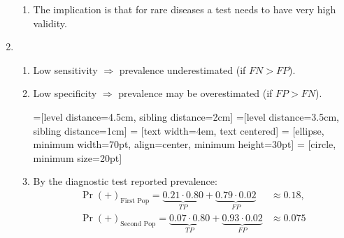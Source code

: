 \documentclass[12pt,a4paper,twoside]{article}
\begin{document}
\begin{enumerate}[label=\bfseries Q\arabic*.]
\begin{enumerate}
  \item %
    The implication is that for rare diseases a test needs to have very high validity.
  \end{enumerate}
  
\item %

  \begin{enumerate}
    
  \item %
    Low sensitivity $\Rightarrow$ prevalence underestimated (if $FN > FP$).
    
  \item
    Low specificity $\Rightarrow$ prevalence may be overestimated
    (if $FP > FN$).	
    
    
    
    =[level distance=4.5cm, sibling distance=2cm]
    =[level distance=3.5cm, sibling distance=1cm]
     = [text width=4em, text centered]
     = [ellipse, minimum width=70pt, align=center, minimum height=30pt]
     = [circle, minimum size=20pt]
    

  \item By the diagnostic test reported prevalence:
    \begin{align*} %
      \Pr(+)_{\text{First Pop}} = \underbrace{0.21 \cdot 0.80}_{TP} + 
      \underbrace{0.79 \cdot 0.02}_{FP} &\approx 0.18,\\
      \Pr(+)_{\text{Second Pop}} = \underbrace{0.07 \cdot 0.80}_{TP} + 
      \underbrace{0.93 \cdot 0.02}_{FP}
                                        &\approx 0.075                                          
    \end{align*}
    

\end{enumerate}
\end{enumerate}
\end{document}
